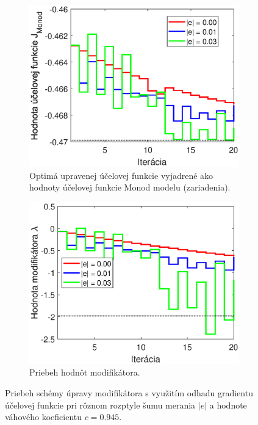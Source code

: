 \begin{figure}
	\centering
	\begin{subfigure}[b]{0.49\textwidth}
		\centering
		\includegraphics[width=\linewidth]{images/mas_noiseDist_costFun}
		\caption{Optimá upravenej účelovej funkcie vyjadrené ako hodnoty účelovej funkcie Monod modelu (zariadenia).}
		\label{fig:mas_noiseDist_costF}
	\end{subfigure}
	\hfill
	\begin{subfigure}[b]{0.49\textwidth}
		\centering
		\includegraphics[width=\linewidth]{images/mas_noiseDist_lam}
		\caption{Priebeh hodnôt modifikátora. \newline \newline}
		\label{fig:mas_noiseDist_lam}
	\end{subfigure}
	\caption{Priebeh schémy úpravy modifikátora s využitím odhadu gradientu účelovej funkcie pri rôznom rozptyle šumu merania $ \left|e\right| $ a hodnote váhového koeficientu $ c = 0.945 $.}
	\label{fig:mas_noiseDist}
\end{figure}

